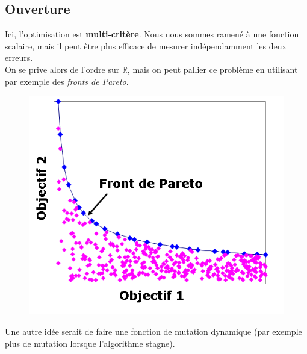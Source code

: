 \documentclass[graphics]{beamer}
\begin{document}
\subsection{Ouverture}

\begin{frame}
Ici, l'optimisation est \textbf{multi-critère}. Nous nous sommes ramené à une fonction  scalaire, mais il peut être plus efficace de mesurer indépendamment les deux erreurs. \\
On se prive alors de l'ordre sur $\mathbb{R}$, mais on peut pallier ce problème en utilisant par exemple des \textit{fronts de Pareto}.
\begin{figure}[H]
	\centering
	\includegraphics[scale=0.3]{pareto}
\end{figure}

Une autre idée serait de faire une fonction de mutation dynamique (par exemple plus de mutation lorsque l'algorithme stagne).
\end{frame}
\end{document}
